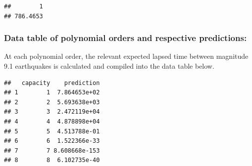 \begin{verbatim}
##        1 
## 786.4653
\end{verbatim}

\hypertarget{data-table-of-polynomial-orders-and-respective-predictions}{%
\subsubsection{Data table of polynomial orders and respective
predictions:}\label{data-table-of-polynomial-orders-and-respective-predictions}}

At each polynomial order, the relevant expected lapsed time between
magnitude 9.1 earthquakes is calculated and compiled into the data table
below.

\begin{Shaded}
\begin{Highlighting}[]
\OtherTok{\textless{}{-}} \SpecialCharTok{:}
\OtherTok{\textless{}{-}} 

\OtherTok{\textless{}{-}} \NormalTok{(}\SpecialCharTok{\textasciitilde{}} 
\OtherTok{\textless{}{-}}  \NormalTok{(} \NormalTok{))}
\OtherTok{\textless{}{-}} \SpecialCharTok{/}\SpecialCharTok{\^{}}
\NormalTok{\}}

\end{Highlighting}
\end{Shaded}

\begin{verbatim}
##   capacity    prediction
## 1        1  7.864653e+02
## 2        2  5.693638e+03
## 3        3  2.472119e+04
## 4        4  4.878898e+04
## 5        5  4.513788e-01
## 6        6  1.522366e-33
## 7        7 8.608668e-153
## 8        8  6.102735e-40
\end{verbatim}

\begin{Shaded}
\begin{Highlighting}[]
\end{Highlighting}
\end{Shaded}

